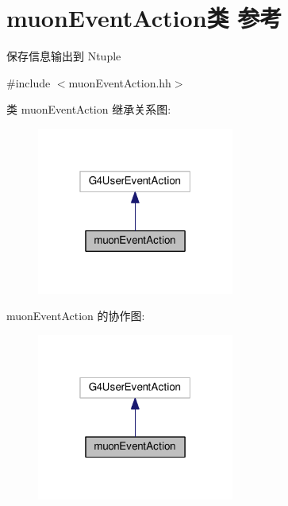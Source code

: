 \hypertarget{classmuonEventAction}{}\section{muon\+Event\+Action类 参考}
\label{classmuonEventAction}


保存信息输出到 Ntuple  




{\ttfamily \#include $<$muon\+Event\+Action.\+hh$>$}



类 muon\+Event\+Action 继承关系图\+:\nopagebreak
\begin{figure}[H]
\begin{center}
\leavevmode
\includegraphics[width=184pt]{classmuonEventAction__inherit__graph}
\end{center}
\end{figure}


muon\+Event\+Action 的协作图\+:\nopagebreak
\begin{figure}[H]
\begin{center}
\leavevmode
\includegraphics[width=184pt]{classmuonEventAction__coll__graph}
\end{center}
\end{figure}
